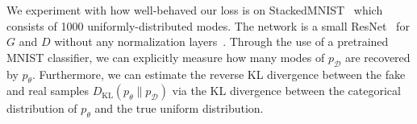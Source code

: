 We experiment with how well-behaved our loss is on StackedMNIST~\cite{pacgan} which consists of 1000 uniformly-distributed modes. The network is a small ResNet~\cite{resnet2} for $G$ and $D$ without any normalization layers~\cite{bn,gn,ln,in}.
Through the use of a pretrained MNIST classifier, we can explicitly measure how many modes of $p_\mathcal{D}$ are recovered by $p_\theta$. Furthermore, we can estimate the reverse KL divergence between the fake and real samples $D_\text{KL}\left(p_\theta\parallel p_\mathcal{D} \right)$ via the KL divergence between the categorical distribution of $p_\theta$ and the true uniform distribution.
\begin{figure}
\begin{floatrow}
\end{floatrow}
\end{figure}

